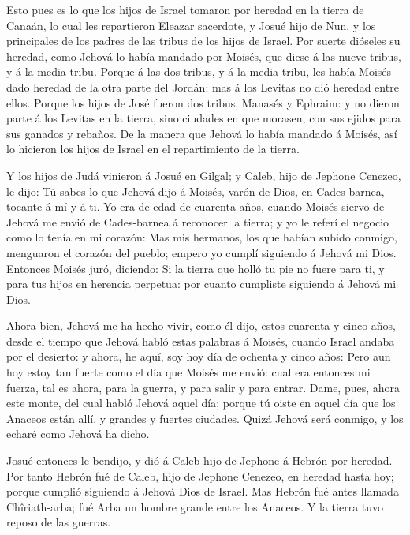  Esto pues es lo que los hijos de Israel tomaron por heredad
en la tierra de Canaán, lo cual les repartieron Eleazar sacerdote, y
Josué hijo de Nun, y los principales de los padres de las tribus de los
hijos de Israel.  Por suerte dióseles su heredad, como
Jehová lo había mandado por Moisés, que diese á las nueve tribus, y á la
media tribu.  Porque á las dos tribus, y á la media tribu,
les había Moisés dado heredad de la otra parte del Jordán: mas á los
Levitas no dió heredad entre ellos.  Porque los hijos de
José fueron dos tribus, Manasés y Ephraim: y no dieron parte á los
Levitas en la tierra, sino ciudades en que morasen, con sus ejidos para
sus ganados y rebaños.  De la manera que Jehová lo había
mandado á Moisés, así lo hicieron los hijos de Israel en el
repartimiento de la tierra.

 Y los hijos de Judá vinieron á Josué en Gilgal; y Caleb,
hijo de Jephone Cenezeo, le dijo: Tú sabes lo que Jehová dijo á Moisés,
varón de Dios, en Cades-barnea, tocante á mí y á ti.  Yo era
de edad de cuarenta años, cuando Moisés siervo de Jehová me envió de
Cades-barnea á reconocer la tierra; y yo le referí el negocio como lo
tenía en mi corazón:  Mas mis hermanos, los que habían
subido conmigo, menguaron el corazón del pueblo; empero yo cumplí
siguiendo á Jehová mi Dios.  Entonces Moisés juró, diciendo:
Si la tierra que holló tu pie no fuere para ti, y para tus hijos en
herencia perpetua: por cuanto cumpliste siguiendo á Jehová mi Dios.

 Ahora bien, Jehová me ha hecho vivir, como él dijo, estos
cuarenta y cinco años, desde el tiempo que Jehová habló estas palabras á
Moisés, cuando Israel andaba por el desierto: y ahora, he aquí, soy hoy
día de ochenta y cinco años:  Pero aun hoy estoy tan fuerte
como el día que Moisés me envió: cual era entonces mi fuerza, tal es
ahora, para la guerra, y para salir y para entrar.  Dame,
pues, ahora este monte, del cual habló Jehová aquel día; porque tú oiste
en aquel día que los Anaceos están allí, y grandes y fuertes ciudades.
Quizá Jehová será conmigo, y los echaré como Jehová ha dicho.

 Josué entonces le bendijo, y dió á Caleb hijo de Jephone á
Hebrón por heredad.  Por tanto Hebrón fué de Caleb, hijo de
Jephone Cenezeo, en heredad hasta hoy; porque cumplió siguiendo á Jehová
Dios de Israel.  Mas Hebrón fué antes llamada
Chîriath-arba; fué Arba un hombre grande entre los Anaceos. Y la tierra
tuvo reposo de las guerras.

